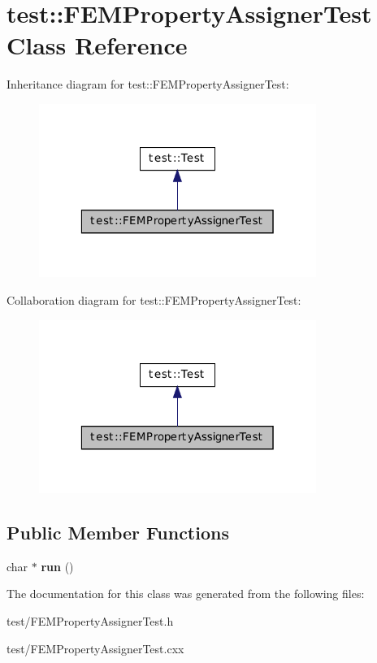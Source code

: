 \hypertarget{classtest_1_1_f_e_m_property_assigner_test}{
\section{test::FEMPropertyAssignerTest Class Reference}
\label{classtest_1_1_f_e_m_property_assigner_test}
}


Inheritance diagram for test::FEMPropertyAssignerTest:\nopagebreak
\begin{figure}[H]
\begin{center}
\leavevmode
\includegraphics[width=256pt]{classtest_1_1_f_e_m_property_assigner_test__inherit__graph}
\end{center}
\end{figure}


Collaboration diagram for test::FEMPropertyAssignerTest:\nopagebreak
\begin{figure}[H]
\begin{center}
\leavevmode
\includegraphics[width=256pt]{classtest_1_1_f_e_m_property_assigner_test__coll__graph}
\end{center}
\end{figure}
\subsection*{Public Member Functions}
\begin{DoxyCompactItemize}
\item 
\hypertarget{classtest_1_1_f_e_m_property_assigner_test_a6ad93d6c4c67a8eb6043ec4583f44dc3}{
char $\ast$ {\bfseries run} ()}
\label{classtest_1_1_f_e_m_property_assigner_test_a6ad93d6c4c67a8eb6043ec4583f44dc3}

\end{DoxyCompactItemize}


The documentation for this class was generated from the following files:\begin{DoxyCompactItemize}
\item 
test/FEMPropertyAssignerTest.h\item 
test/FEMPropertyAssignerTest.cxx\end{DoxyCompactItemize}
